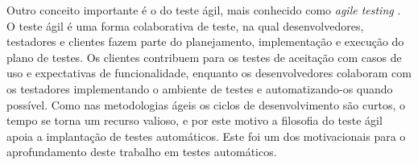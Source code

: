 Outro conceito importante é o do teste ágil, mais conhecido como \emph{agile testing} \cite{myers}. O teste ágil é uma forma colaborativa de teste, na qual desenvolvedores, testadores e clientes fazem parte do planejamento, implementação e execução do plano de testes. Os clientes contribuem para os testes de aceitação com casos de uso e expectativas de funcionalidade, enquanto os desenvolvedores colaboram com os testadores implementando o ambiente de testes e automatizando-os quando possível. Como nas metodologias ágeis os ciclos de desenvolvimento são curtos, o tempo se torna um recurso valioso, e por este motivo a filosofia do teste ágil apoia a implantação de testes automáticos. Este foi um dos motivacionais para o aprofundamento deste trabalho em testes automáticos.